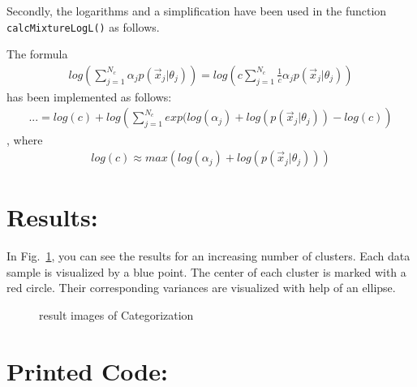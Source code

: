 \documentclass[a4paper,headings=small]{scrartcl}
\numberwithin{equation}{section} %
\numberwithin{figure}{section}   %
\newcommand{\imgGeneratedRoot}{../../../target}
\begin{document}
Secondly, the logarithms and a simplification have been used in the function \lstinline!calcMixtureLogL()!
as follows.

The formula
\begin{align}
log \left( \sum\nolimits_{j=1}^{N_c} \alpha_j p( \vec x_j | \theta_j )  \right) = 
      log \left( c \sum\nolimits_{j=1}^{N_c} \frac{1}{c} \alpha_j p( \vec x_j | \theta_j ) \right)
\end{align}
has been implemented as follows:
\begin{align}
... = log \left( c \right)
      + log \left(\sum\nolimits_{j=1}^{N_c} exp( log (\alpha_j)
         + log \left( p( \vec x_j | \theta_j ) \right) 
         - log \left( c \right) \right)
\end{align}
, where
\begin{align}
log(c) \approx max \left( log(\alpha_j) + log \left( p( \vec x_j | \theta_j ) \right) \right)
\end{align}


\section{Results:}

In Fig.~\ref{fig:clusterintResults},
you can see the results for an increasing number of clusters.
Each data sample is visualized by a blue point. 
The center of each cluster is marked with a red circle.
Their corresponding variances are visualized with help of an ellipse.

\begin{figure}
 \hfill
{} \hfill
{} \hfill
{} \hfill
{} \hfill
{}
\caption{result images of Categorization}
\label{fig:clusterintResults}
\end{figure}

\newpage
\section{Printed Code:}


\end{document}
